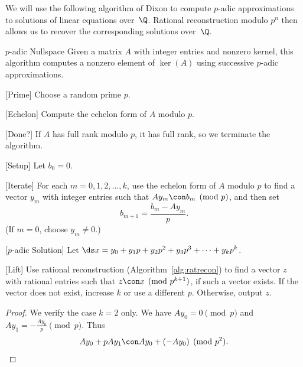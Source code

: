 We will use the following algorithm of Dixon \cite{dixon:exact} to
compute $p$-adic approximations to solutions of linear equations
over~$\Q$.  Rational reconstruction modulo $p^n$ then allows us
to recover the corresponding solutions over~$\Q$.
\begin{algorithm}{$p$-adic Nullspace}\label{alg:dixon}
Given a matrix $A$ with integer entries and nonzero kernel, this
algorithm computes a nonzero element of $\ker(A)$
using successive $p$-adic approximations.
\begin{steps}
\item{}[Prime] Choose a random prime $p$.
\item{}[Echelon] Compute the echelon form of $A$ modulo $p$.
\item{}[Done?] If $A$ has full rank modulo $p$, it has full rank,
so we terminate the algorithm.
\item{}[Setup] Let $b_0 = 0$.
\item{}[Iterate] For each $m=0,1,2,\ldots, k$, 
use the echelon form of $A$ modulo $p$ to find a vector $y_m$
with integer entries such that $A y_m \con b_m\pmod{p}$,
and then set 
  $$
    b_{m+1} = \frac{b_m - A y_m}{p}.
  $$
(If $m=0$, choose $y_m\neq 0$.)
\item{}[$p$-adic Solution]
Let $\ds x=y_0 + y_1 p + y_2 p^2 + y_3 p^3 + \cdots + y_k p^k$.
\item{}[Lift] Use rational reconstruction (Algorithm~\ref{alg:ratrecon})
to find a vector $z$ with rational entries such that
$z \con x \pmod{p^{k+1}}$, if such a vector exists.  If the
vector does not exist, increase $k$ or use a different $p$.
Otherwise, output $z$.
\end{steps}
\end{algorithm}
\begin{proof}
We verify the case $k=2$ only.
We have $A y_0 = 0\pmod{p}$ and $Ay_1 = -\frac{Ay_0}{p}\pmod{p}$.
Thus
$$
  A y_0 + p A y_1 \con A y_0 + (-Ay_0) \pmod{p^2}.
$$
\end{proof}



